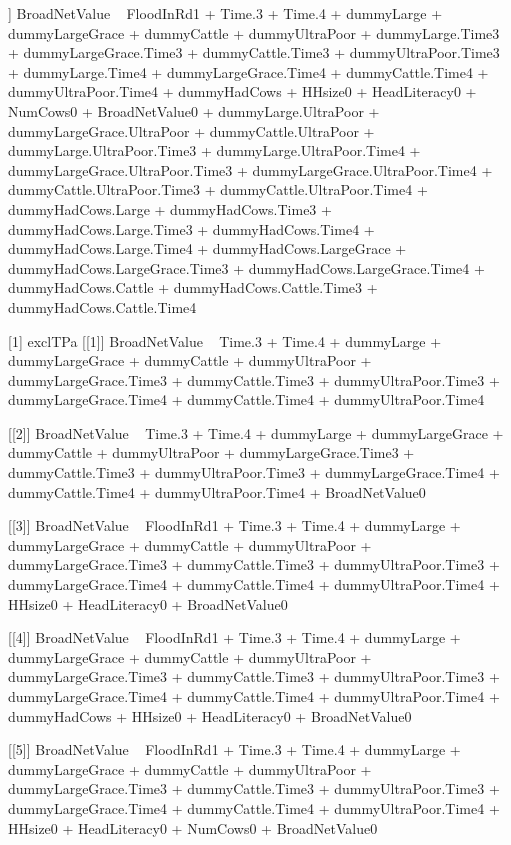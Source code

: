 \begin{Schunk}
\begin{Soutput}
[[6]]
BroadNetValue ~ FloodInRd1 + Time.3 + Time.4 + dummyLarge + dummyLargeGrace + 
    dummyCattle + dummyUltraPoor + dummyLarge.Time3 + dummyLargeGrace.Time3 + 
    dummyCattle.Time3 + dummyUltraPoor.Time3 + dummyLarge.Time4 + 
    dummyLargeGrace.Time4 + dummyCattle.Time4 + dummyUltraPoor.Time4 + 
    dummyHadCows + HHsize0 + HeadLiteracy0 + NumCows0 + BroadNetValue0 + 
    dummyLarge.UltraPoor + dummyLargeGrace.UltraPoor + dummyCattle.UltraPoor + 
    dummyLarge.UltraPoor.Time3 + dummyLarge.UltraPoor.Time4 + 
    dummyLargeGrace.UltraPoor.Time3 + dummyLargeGrace.UltraPoor.Time4 + 
    dummyCattle.UltraPoor.Time3 + dummyCattle.UltraPoor.Time4 + 
    dummyHadCows.Large + dummyHadCows.Time3 + dummyHadCows.Large.Time3 + 
    dummyHadCows.Time4 + dummyHadCows.Large.Time4 + dummyHadCows.LargeGrace + 
    dummyHadCows.LargeGrace.Time3 + dummyHadCows.LargeGrace.Time4 + 
    dummyHadCows.Cattle + dummyHadCows.Cattle.Time3 + dummyHadCows.Cattle.Time4

[1] exclTPa
[[1]]
BroadNetValue ~ Time.3 + Time.4 + dummyLarge + dummyLargeGrace + 
    dummyCattle + dummyUltraPoor + dummyLargeGrace.Time3 + dummyCattle.Time3 + 
    dummyUltraPoor.Time3 + dummyLargeGrace.Time4 + dummyCattle.Time4 + 
    dummyUltraPoor.Time4

[[2]]
BroadNetValue ~ Time.3 + Time.4 + dummyLarge + dummyLargeGrace + 
    dummyCattle + dummyUltraPoor + dummyLargeGrace.Time3 + dummyCattle.Time3 + 
    dummyUltraPoor.Time3 + dummyLargeGrace.Time4 + dummyCattle.Time4 + 
    dummyUltraPoor.Time4 + BroadNetValue0

[[3]]
BroadNetValue ~ FloodInRd1 + Time.3 + Time.4 + dummyLarge + dummyLargeGrace + 
    dummyCattle + dummyUltraPoor + dummyLargeGrace.Time3 + dummyCattle.Time3 + 
    dummyUltraPoor.Time3 + dummyLargeGrace.Time4 + dummyCattle.Time4 + 
    dummyUltraPoor.Time4 + HHsize0 + HeadLiteracy0 + BroadNetValue0

[[4]]
BroadNetValue ~ FloodInRd1 + Time.3 + Time.4 + dummyLarge + dummyLargeGrace + 
    dummyCattle + dummyUltraPoor + dummyLargeGrace.Time3 + dummyCattle.Time3 + 
    dummyUltraPoor.Time3 + dummyLargeGrace.Time4 + dummyCattle.Time4 + 
    dummyUltraPoor.Time4 + dummyHadCows + HHsize0 + HeadLiteracy0 + 
    BroadNetValue0

[[5]]
BroadNetValue ~ FloodInRd1 + Time.3 + Time.4 + dummyLarge + dummyLargeGrace + 
    dummyCattle + dummyUltraPoor + dummyLargeGrace.Time3 + dummyCattle.Time3 + 
    dummyUltraPoor.Time3 + dummyLargeGrace.Time4 + dummyCattle.Time4 + 
    dummyUltraPoor.Time4 + HHsize0 + HeadLiteracy0 + NumCows0 + 
    BroadNetValue0


\end{Soutput}
\end{Schunk}
